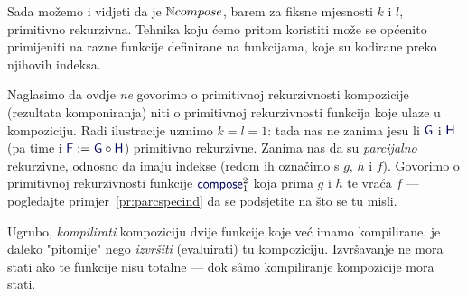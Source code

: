 
Sada možemo i vidjeti da je ${\mathbb N} compose$, barem za fiksne mjesnosti $k$ i $l$, primitivno rekurzivna. Tehnika koju ćemo pritom koristiti može se općenito primijeniti na razne funkcije definirane na funkcijama, koje su kodirane preko njihovih indeksa.

Naglasimo da ovdje \emph{ne} govorimo o primitivnoj rekurzivnosti kompozicije (rezultata komponiranja) niti o primitivnoj rekurzivnosti funkcija koje ulaze u kompoziciju. Radi ilustracije uzmimo $k=l=1$: tada nas ne zanima jesu li $\f G$ i $\f H$ (pa time i $\f F:=\f G\circ\f H$) primitivno rekurzivne. Zanima nas da su \emph{parcijalno} rekurzivne, odnosno da imaju indekse (redom ih označimo s $g$, $h$ i $f$). Govorimo o primitivnoj rekurzivnosti funkcije $\f{compose}_1^2$ koja prima $g$ i $h$ te vraća $f$ --- pogledajte primjer~\ref{pr:parcspecind} da se podsjetite na što se tu misli.

Ugrubo, \emph{kompilirati} kompoziciju dvije funkcije koje već imamo kompilirane, je daleko "pitomije" nego \emph{izvršiti} (evaluirati) tu kompoziciju. Izvršavanje ne mora stati ako te funkcije nisu totalne --- dok sâmo kompiliranje kompozicije mora stati.

